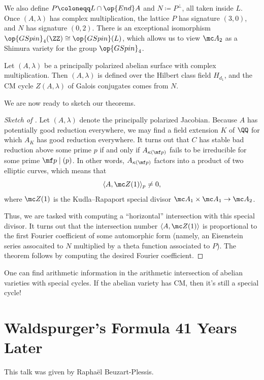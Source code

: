 \documentclass{article}
\begin{document}
We also define $P\coloneqq L\cap\op{End}A$ and $N\coloneqq P^\perp$, all taken inside $L$. Once $(A,\lambda)$ has complex multiplication, the lattice $P$ has signature $(3,0)$, and $N$ has signature $(0,2)$. There is an exceptional isomorphism $\op{GSpin}_4(\ZZ)\cong\op{GSpin}(L)$, which allows us to view $\mc A_2$ as a Shimura variety for the group $\op{GSpin}_4$.
\begin{theorem} \label{thm:produce-cm-cycle}
	Let $(A,\lambda)$ be a principally polarized abelian surface with complex multiplication. Then $(A,\lambda)$ is defined over the Hilbert class field $H_{d_1}$, and the CM cycle $Z(A,\lambda)$ of Galois conjugates comes from $N$.
\end{theorem}
We are now ready to sketch our theorems.
\begin{proof}[Sketch of ]
	Let $(A,\lambda)$ denote the principally polarized Jacobian. Because $A$ has potentially good reduction everywhere, we may find a field extension $K$ of $\QQ$ for which $A_K$ has good reduction everywhere. It turns out that $C$ has stable bad reduction above some prime $p$ if and only if $A_{\kappa(\mf p)}$ fails to be irreducible for some prime $\mf p\mid(p)$. In other words, $A_{\kappa(\mf p)}$ factors into a product of two elliptic curves, which means that
	\[\langle A,\mc Z(1)\rangle_p\ne0,\]
	where $\mc Z(1)$ is the Kudla--Rapaport special divisor $\mc A_1\times\mc A_1\to\mc A_2$.

	Thus, we are tasked with computing a ``horizontal'' intersection with this special divisor. It turns out that the intersection number $\langle A,\mc Z(1)\rangle$ is proportional to the first Fourier coefficient of some automorphic form (namely, an Eisenstein series assocaited to $N$ multiplied by a theta function associated to $P$). The theorem follows by computing the desired Fourier coefficient.
\end{proof}
\begin{idea}
	One can find arithmetic information in the arithmetic intersection of abelian varieties with special cycles. If the abelian variety has CM, then it's still a special cycle!
\end{idea}

\section{Waldspurger's Formula 41 Years Later}
This talk was given by Rapha\"el Beuzart-Plessis.
\end{document}
